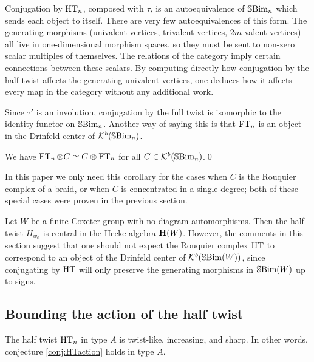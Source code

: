 \begin{remark} \label{rmk:provingcentral} Conjugation by $\operatorname{HT}_n$, composed with $\tau$, is an autoequivalence of ${\mathbb{S}}{\rm Bim }_n$ which sends each object to itself. There are very few
autoequivalences of this form. The generating morphisms (univalent vertices, trivalent vertices, $2m$-valent vertices) all live in one-dimensional morphism spaces, so they must be sent
to non-zero scalar multiples of themselves. The relations of the category imply certain connections between these scalars. By computing directly how conjugation by the half twist affects
the generating univalent vertices, one deduces how it affects every map in the category without any additional work. \end{remark}

Since $\tau'$ is an involution, conjugation by the full twist is isomorphic to the identity functor on ${\mathbb{S}}{\rm Bim }_n$. Another way of saying this is that $\operatorname{FT}_n$ is an object in the Drinfeld
center of ${\mathcal{K}}^b({\mathbb{S}}{\rm Bim }_n)$.

\begin{corollary} \label{cor:FTreallycommutes}
We have $\operatorname{FT}_n\otimes C\simeq C\otimes \operatorname{FT}_n$ for all $C\in {\mathcal{K}}^b({\mathbb{S}}{\rm Bim }_n)$.\qed
\end{corollary}

In this paper we only need this corollary for the cases when $C$ is the Rouquier complex of a braid, or when $C$ is concentrated in a single degree; both of these special cases were
proven in the previous section.

\begin{remark}\label{rmk:HTnotCentral}
Let $W$ be a finite Coxeter group with no diagram automorphisms.  Then the half-twist $H_{w_0}$ is central in the Hecke algebra ${\mathbf H}(W)$.  However, the comments in this section suggest that one should not expect the Rouquier complex $\operatorname{HT}$ to correspond to an object of the Drinfeld center of ${\mathcal{K}}^b({\mathbb{S}}{\rm Bim }(W))$, since conjugating by $\operatorname{HT}$ will only preserve the generating morphisms in ${\mathbb{S}}{\rm Bim }(W)$ up to signs.
\end{remark}

\subsection{Bounding the action of the half twist}
\label{subsec:bounding}

\begin{thm} \label{thm:HTactionA} The half twist $\operatorname{HT}_n$ in type $A$ is twist-like, increasing, and sharp. In other words, conjecture \ref{conj:HTaction} holds in type $A$. \end{thm}

